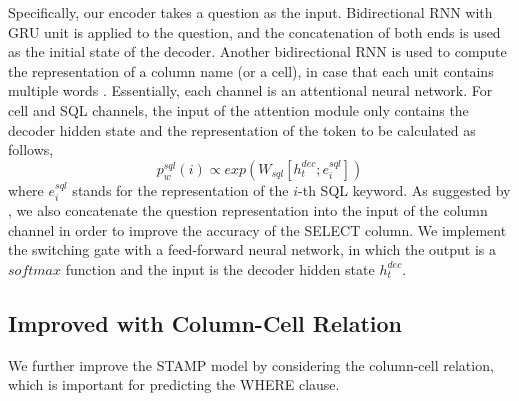 \documentclass[11pt,a4paper]{article}
\begin{document}
Specifically, our encoder takes a question as the input. Bidirectional RNN with GRU unit is applied to the question, and the concatenation of both ends is used as the initial state of the decoder.
Another bidirectional RNN is used to compute the representation of a column name (or a cell), in case that each unit contains multiple words  \cite{dong2015hybrid}.
Essentially, each channel is an attentional neural network.
For cell and SQL channels, the input of the attention module only contains the decoder hidden state and the representation of the token to be calculated as follows,
\begin{equation}
p_w^{sql}(i)  \propto exp(W_{sql} [h^{dec}_t;e^{sql}_i])
\end{equation}
where $e^{sql}_i$ stands for the representation of the $i$-th SQL keyword.
As suggested by \cite{zhong2017seq2sql}, we also concatenate the question representation into the input of the column channel in order to improve the accuracy of the SELECT column.
We implement the switching gate with a feed-forward neural network, in which the output is a $softmax$ function and the input is the decoder hidden state $h^{dec}_t$.


\subsection{Improved with Column-Cell Relation}
\label{section:improved-column-cell}
We further improve the STAMP model by considering the column-cell relation,
which is important for predicting the WHERE clause.
\end{document}
